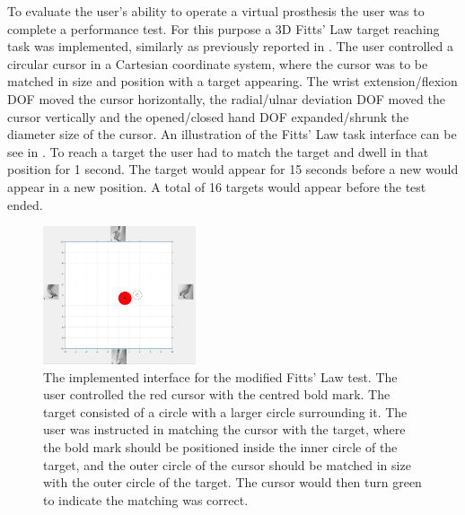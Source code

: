 To evaluate the user's ability to operate a virtual prosthesis the user was to complete a performance test. For this purpose a 3D Fitts' Law target reaching task was implemented, similarly as previously reported in \cite{Scheme2013, Scheme2013a}. The user controlled a circular cursor in a Cartesian coordinate system, where the cursor was to be matched in size and position with a target appearing. The wrist extension/flexion DOF moved the cursor horizontally, the radial/ulnar deviation DOF moved the cursor vertically and the opened/closed hand DOF expanded/shrunk the diameter size of the cursor. An illustration of the Fitts' Law task interface can be see in . To reach a target the user had to match the target and dwell in that position for 1 second. The target would appear for 15 seconds before a new would appear in a new position. A total of 16 targets would appear before the test ended. \\

\begin{figure}[H] 
	\includegraphics[width=0.4\textwidth]{figures/Paper/perftestGUI}
	\caption{The implemented interface for the modified Fitts' Law test. The user controlled the red cursor with the centred bold mark. The target consisted of a circle with a larger circle surrounding it. The user was instructed in matching the cursor with the target, where the bold mark should be positioned inside the inner circle of the target, and the outer circle of the cursor should be matched in size with the outer circle of the target. The cursor would then turn green to indicate the matching was correct.}
	\label{fig:fittsLawTask}
\end{figure}

